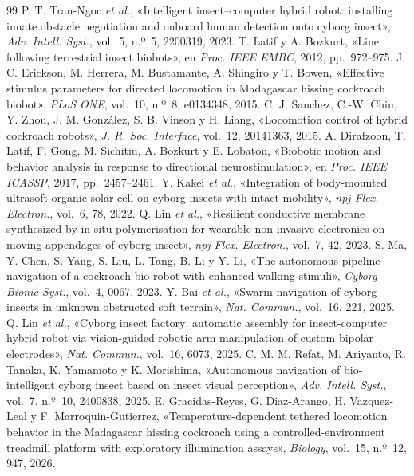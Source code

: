 {\begin{thebibliography}{99}
 P. T. Tran-Ngoc \textit{et al.}, «Intelligent insect--computer hybrid robot: installing innate obstacle negotiation and onboard human detection onto cyborg insect», \textit{Adv. Intell. Syst.}, vol.~5, n.º~5, 2200319, 2023.
 T. Latif y A. Bozkurt, «Line following terrestrial insect biobots», en \textit{Proc. IEEE EMBC}, 2012, pp.~972--975.
 J. C. Erickson, M. Herrera, M. Bustamante, A. Shingiro y T. Bowen, «Effective stimulus parameters for directed locomotion in Madagascar hissing cockroach biobot», \textit{PLoS ONE}, vol.~10, n.º~8, e0134348, 2015.
 C. J. Sanchez, C.-W. Chiu, Y. Zhou, J. M. González, S. B. Vinson y H. Liang, «Locomotion control of hybrid cockroach robots», \textit{J. R. Soc. Interface}, vol.~12, 20141363, 2015.
 A. Dirafzoon, T. Latif, F. Gong, M. Sichitiu, A. Bozkurt y E. Lobaton, «Biobotic motion and behavior analysis in response to directional neurostimulation», en \textit{Proc. IEEE ICASSP}, 2017, pp.~2457--2461.
 Y. Kakei \textit{et al.}, «Integration of body-mounted ultrasoft organic solar cell on cyborg insects with intact mobility», \textit{npj Flex. Electron.}, vol.~6, 78, 2022.
 Q. Lin \textit{et al.}, «Resilient conductive membrane synthesized by in-situ polymerisation for wearable non-invasive electronics on moving appendages of cyborg insect», \textit{npj Flex. Electron.}, vol.~7, 42, 2023.
 S. Ma, Y. Chen, S. Yang, S. Liu, L. Tang, B. Li y Y. Li, «The autonomous pipeline navigation of a cockroach bio-robot with enhanced walking stimuli», \textit{Cyborg Bionic Syst.}, vol.~4, 0067, 2023.
 Y. Bai \textit{et al.}, «Swarm navigation of cyborg-insects in unknown obstructed soft terrain», \textit{Nat. Commun.}, vol.~16, 221, 2025.
 Q. Lin \textit{et al.}, «Cyborg insect factory: automatic assembly for insect-computer hybrid robot via vision-guided robotic arm manipulation of custom bipolar electrodes», \textit{Nat. Commun.}, vol.~16, 6073, 2025.
 C. M. M. Refat, M. Ariyanto, R. Tanaka, K. Yamamoto y K. Morishima, «Autonomous navigation of bio-intelligent cyborg insect based on insect visual perception», \textit{Adv. Intell. Syst.}, vol.~7, n.º~10, 2400838, 2025.
 E. Gracidas-Reyes, G. Diaz-Arango, H. Vazquez-Leal y F. Marroquin-Gutierrez, «Temperature-dependent tethered locomotion behavior in the Madagascar hissing cockroach using a controlled-environment treadmill platform with exploratory illumination assays», \textit{Biology}, vol.~15, n.º~12, 947, 2026.

\end{thebibliography}}
